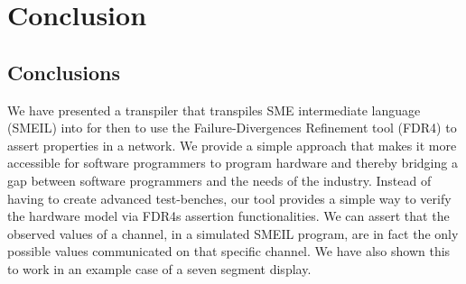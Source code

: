
\chapter{Conclusion}
\section{Conclusions}
We have presented a transpiler that transpiles SME intermediate language (SMEIL) into \cspm{} for then to use the Failure-Divergences Refinement tool (FDR4) to assert properties in a \cspm{} network. We provide a simple approach that makes it more accessible for software programmers to program hardware and thereby bridging a gap between software programmers and the needs of the industry.
Instead of having to create advanced test-benches, our tool provides a simple way to verify the hardware model via FDR4s assertion functionalities. We can assert that the observed values of a channel, in a simulated SMEIL program, are in fact the only possible values communicated on that specific channel. We have also shown this to work in an example case of a seven segment display.
